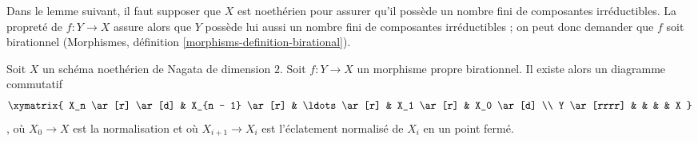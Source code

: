 \noindent Dans le lemme suivant, il faut supposer que $X$ est noethérien pour assurer qu'il possède un nombre fini de composantes irréductibles. La propreté de $f : Y \to X$ assure alors que $Y$ possède lui aussi un nombre fini de composantes irréductibles ; on peut donc demander que $f$ soit birationnel (Morphismes, définition \ref{morphisms-definition-birational}).

\begin{lemma} \label{lemma-dominate-by-normalized-blowing-up} Soit $X$ un schéma noethérien de Nagata de dimension $2$. Soit $f : Y \to X$ un morphisme propre birationnel. Il existe alors un diagramme commutatif $$
\xymatrix{
X_n \ar[r] \ar[d] &
X_{n - 1} \ar[r] &
\ldots \ar[r] &
X_1 \ar[r] &
X_0 \ar[d] \\
Y \ar[rrrr]  & & & & X
}
$$, où $X_0 \to X$ est la normalisation et où $X_{i + 1} \to X_i$ est l'éclatement normalisé de $X_i$ en un point fermé. \end{lemma}

